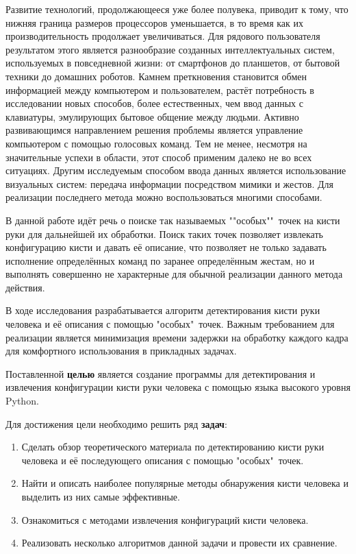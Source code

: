 Развитие технологий, продолжающееся уже более полувека, приводит к тому, что нижняя граница
размеров процессоров уменьшается, в то время как их производительность продолжает
увеличиваться. Для рядового пользователя результатом этого является разнообразие созданных
интеллектуальных систем, используемых в повседневной жизни: от смартфонов до планшетов, от
бытовой техники до домашних роботов. Камнем преткновения становится обмен информацией между
компьютером и пользователем, растёт потребность в исследовании новых способов, более 
естественных, чем ввод данных с клавиатуры, эмулирующих бытовое общение между людьми. 
Активно развивающимся направлением решения проблемы является управление компьютером с помощью 
голосовых команд. Тем не менее, несмотря на значительные успехи в области, этот способ
применим далеко не во всех ситуациях. Другим исследуемым способом ввода данных является
использование визуальных систем: передача информации посредством мимики и жестов. Для реализации
последнего метода можно воспользоваться многими способами. 

В данной работе идёт речь о поиске так называемых ""особых""\ точек на кисти руки 
для дальнейшей их обработки. Поиск таких точек позволяет извлекать конфигурацию кисти
и давать её описание, что позволяет не только задавать исполнение определённых 
команд по заранее определённым жестам, но и выполнять совершенно не характерные для обычной
реализации данного метода действия.

В ходе исследования разрабатывается алгоритм детектирования кисти руки человека и её описания
с помощью "особых"\ точек. Важным требованием для реализации является минимизация времени
задержки на обработку каждого кадра для комфортного использования в прикладных задачах.

Поставленной {\bf целью} является создание программы для детектирования и извлечения 
конфигурации кисти руки человека с помощью языка высокого уровня Python.

Для достижения цели необходимо решить ряд {\bf задач}:
\begin{enumerate}
	\item Сделать обзор теоретического материала по детектированию кисти руки человека и 
её последующего описания с помощью "особых"\ точек.
	\item Найти и описать наиболее популярные методы обнаружения кисти человека и выделить из них самые эффективные.
	\item Ознакомиться с методами извлечения конфигураций кисти человека.
	\item Реализовать несколько алгоритмов данной задачи и провести их сравнение.
\end{enumerate}